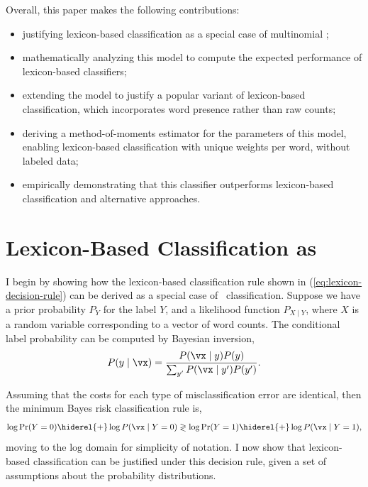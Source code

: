 Overall, this paper makes the following contributions:
\begin{itemize}
\item justifying lexicon-based classification as a special case of multinomial \nb;
\item mathematically analyzing this model to compute the expected performance of lexicon-based classifiers;
\item extending the model to justify a popular variant of lexicon-based classification, which incorporates word presence rather than raw counts;
\item deriving a method-of-moments estimator for the parameters of this model, enabling lexicon-based classification with unique weights per word, without labeled data;
\item empirically demonstrating that this classifier outperforms lexicon-based classification and alternative approaches.
\end{itemize}

\section{Lexicon-Based Classification as \nb}
I begin by showing how the lexicon-based classification rule shown in (\ref{eq:lexicon-decision-rule}) can be derived as a special case of \nb\ classification. Suppose we have a prior probability $P_Y$ for the label $Y$, and a likelihood function $P_{X \mid Y}$, where $X$ is a random variable corresponding to a vector of word counts. The conditional label probability can be computed by Bayesian inversion,
\begin{dmath}
P(y \mid \vx) = \frac{P(\vx \mid y) P(y)}{\sum_{y'} P(\vx \mid y')P(y')}.
\end{dmath}

Assuming that the costs for each type of misclassification error are identical, then the minimum Bayes risk classification rule is,
\begin{dmath}
  \label{eq:basic-decision-rule}
  \log \Pr(Y=0) \hiderel{+} \log P(\vx \mid Y=0)\\ \gtrless \log \Pr(Y=1) \hiderel{+} \log P(\vx \mid Y=1),
\end{dmath}
moving to the log domain for simplicity of notation. I now show that lexicon-based classification can be justified under this decision rule, given a set of assumptions about the probability distributions. 

